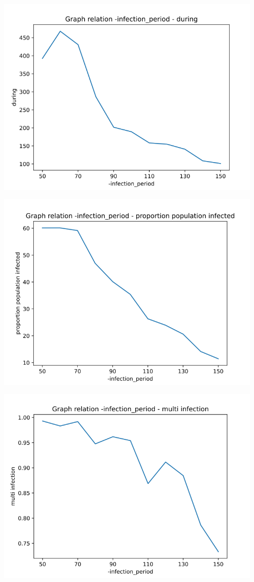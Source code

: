 \documentclass[a4paper, 11pt]{article}
\begin{document}
				
				\includegraphics[scale=0.45]{attachements/infection_period_during.png}
				
				\includegraphics[scale=0.45]{attachements/infection_period_proportion.png}
				
				\includegraphics[scale=0.45]{attachements/infection_period_multi_infection.png}
				
\end{document}
